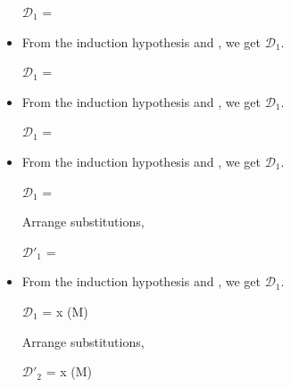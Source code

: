 \begin{itemize}
	      $\mathcal{D}_1$ = 
	      {}
	      	      	      
	\item \QSym
	      	      	      
	      From the induction hypothesis and \QSym, we get $\mathcal{D}_1$.
	      	      	      
	      $\mathcal{D}_1$ = 
	      {}
	      	      	      
	\item \QTrans
	      	      	      
	      From the induction hypothesis and \QTrans, we get $\mathcal{D}_1$.
	      	      	      
	      $\mathcal{D}_1$ = 
	      { \andalso {}}
	      	      	      
	\item \QBeta
	      	      	      
	      From the induction hypothesis and \QBeta, we get $\mathcal{D}_1$.
	      	      	      
	      $\mathcal{D}_1$ = 
	      { \andalso {}}
	      	      	      
	      Arrange substitutions,
	      	      	      
	      $\mathcal{D}'_1$ = 
	      { \andalso {}}
	      	      	      
	\item \QEta
	      	      	      
	      From the induction hypothesis and \QEta, we get $\mathcal{D}_1$.
	      	      	      
	      $\mathcal{D}_1$ = 
	      { \andalso x \notin \FV(M\SB)}
	      	      	      
	      Arrange substitutions,
	      	      	      
	      $\mathcal{D}'_2$ = 
	      { \andalso x \notin \FV(M\SB)}
	      	      	      

\end{itemize}
